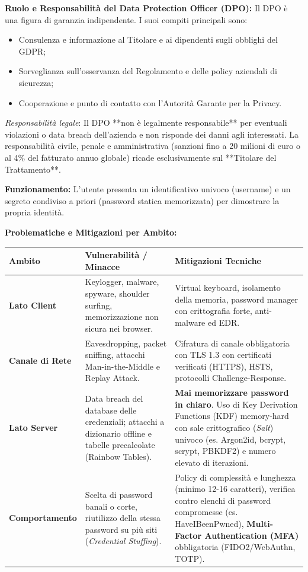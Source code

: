 \documentclass[11pt,a4paper]{article}
\begin{document}
\begin{solutionbox}
\textbf{Ruolo e Responsabilit\`a del Data Protection Officer (DPO):}
Il DPO \`e una figura di garanzia indipendente. I suoi compiti principali sono:
\begin{itemize}
    \item Consulenza e informazione al Titolare e ai dipendenti sugli obblighi del GDPR;
    \item Sorveglianza sull'osservanza del Regolamento e delle policy aziendali di sicurezza;
    \item Cooperazione e punto di contatto con l'Autorit\`a Garante per la Privacy.
\end{itemize}
\textit{Responsabilit\`a legale}: Il DPO **non \`e legalmente responsabile** per eventuali violazioni o data breach dell'azienda e non risponde dei danni agli interessati. La responsabilit\`a civile, penale e amministrativa (sanzioni fino a 20 milioni di euro o al 4\% del fatturato annuo globale) ricade esclusivamente sul **Titolare del Trattamento**.
\end{solutionbox}

\begin{solutionbox}
\textbf{Funzionamento:} L'utente presenta un identificativo univoco (username) e un segreto condiviso a priori (password statica memorizzata) per dimostrare la propria identit\`a.

\textbf{Problematiche e Mitigazioni per Ambito:}
\begin{center}
\small
\begin{tabularx}{\textwidth}{lXX}
\toprule
\textbf{Ambito} & \textbf{Vulnerabilit\`a / Minacce} & \textbf{Mitigazioni Tecniche} \\
\midrule
\textbf{Lato Client} & Keylogger, malware, spyware, shoulder surfing, memorizzazione non sicura nei browser. & Virtual keyboard, isolamento della memoria, password manager con crittografia forte, anti-malware ed EDR. \\
\textbf{Canale di Rete} & Eavesdropping, packet sniffing, attacchi Man-in-the-Middle e Replay Attack. & Cifratura di canale obbligatoria con TLS 1.3 con certificati verificati (HTTPS), HSTS, protocolli Challenge-Response. \\
\textbf{Lato Server} & Data breach del database delle credenziali; attacchi a dizionario offline e tabelle precalcolate (Rainbow Tables). & \textbf{Mai memorizzare password in chiaro}. Uso di Key Derivation Functions (KDF) memory-hard con sale crittografico (\textit{Salt}) univoco (es. Argon2id, bcrypt, scrypt, PBKDF2) e numero elevato di iterazioni. \\
\textbf{Comportamento} & Scelta di password banali o corte, riutilizzo della stessa password su pi\`u siti (\textit{Credential Stuffing}). & Policy di complessit\`a e lunghezza (minimo 12-16 caratteri), verifica contro elenchi di password compromesse (es. HaveIBeenPwned), \textbf{Multi-Factor Authentication (MFA)} obbligatoria (FIDO2/WebAuthn, TOTP). \\
\bottomrule
\end{tabularx}
\end{center}
\end{solutionbox}
\end{document}
